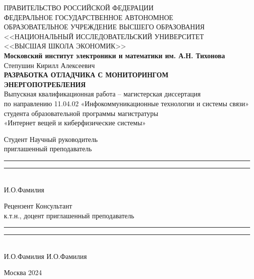 \begin{titlepage}
    \newpage
    
    \begin{center}
    ПРАВИТЕЛЬСТВО РОССИЙСКОЙ ФЕДЕРАЦИИ \\
    \vspace{1em}
    ФЕДЕРАЛЬНОЕ  ГОСУДАРСТВЕННОЕ АВТОНОМНОЕ \\
    ОБРАЗОВАТЕЛЬНОЕ УЧРЕЖДЕНИЕ ВЫСШЕГО ОБРАЗОВАНИЯ \\
    <<НАЦИОНАЛЬНЫЙ ИССЛЕДОВАТЕЛЬСКИЙ УНИВЕРСИТЕТ \\
    <<ВЫСШАЯ ШКОЛА ЭКОНОМИК>> \\
    \vspace{2em}
    \textbf{Московский институт электроники и математики им. А.Н. Тихонова}\\
    \vspace{6em}
    Степушин Кирилл Алексеевич\\
    \vspace{3em}
    \textbf{РАЗРАБОТКА ОТЛАДЧИКА С МОНИТОРИНГОМ ЭНЕРГОПОТРЕБЛЕНИЯ}\\
    \vspace{6em}
    Выпускная квалификационная работа -- магистерская диссертация\\ 
    по направлению 11.04.02 «Инфокоммуникационные технологии и системы связи»\\
    студента образовательной программы магистратуры\\
    «Интернет вещей и киберфизические системы»
    \end{center}

    \vspace{6em}

    \begin{flushleft}
    Студент \hfill Научный руководитель\\
    \hfill приглашенный преподаватель\\
    \vspace{1em}
    \rule{5cm}{0.005cm} \hfill \rule{5cm}{0.01cm}\\
    \hfill И.О.Фамилия

    \vspace{1em}

    Рецензент \hfill Консультант\\
    к.т.н., доцент \hfill приглашенный преподаватель\\
    \vspace{1em}
    \rule{5cm}{0.005cm} \hfill \rule{5cm}{0.01cm}\\
    И.О.Фамилия \hfill И.О.Фамилия
    \end{flushleft}
    
    \vspace{\fill}
    
    \begin{center}
    Москва 2024
    \end{center}
    
    \end{titlepage}